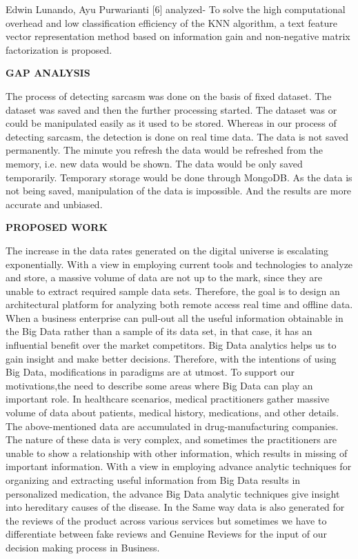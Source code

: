 \documentclass[oneside,a4paper,12pt]{book}
\begin{document}
Edwin Lunando, Ayu Purwarianti [6] analyzed- To solve the high computational overhead and low classification efficiency of the KNN algorithm, a text feature vector representation method based on information gain and non-negative matrix factorization is proposed.


\textbf{GAP ANALYSIS}
\par
The process of detecting sarcasm was done on the basis of fixed dataset. The dataset was saved and then the further processing started. The dataset was or could be manipulated easily as it used to be stored. Whereas in our process of detecting sarcasm, the detection  is done on real time data. The data is not saved permanently. The minute you refresh the data would be refreshed from the memory, i.e. new data would be shown. The data would be only saved temporarily. Temporary storage would be done through MongoDB. As the data is not being saved, manipulation of the data is impossible. And the results are more accurate and unbiased. 

\textbf{PROPOSED WORK}
\par
The increase in the data rates generated on the digital universe is escalating exponentially. With a view in employing current tools and technologies to analyze and store, a massive volume of data are not up to the mark, since they are unable to extract required sample data sets. Therefore, the goal is to design an architectural platform for analyzing both remote access real time and offline data. When a business enterprise can pull-out all the useful information obtainable in the Big Data rather than a sample of its data set, in that case, it has an influential benefit over the market competitors. Big Data analytics helps us to gain insight and make better decisions. Therefore, with the intentions of using Big Data, modifications in paradigms are at utmost. To support our motivations,the need to describe some areas where Big Data can play an important role. In healthcare scenarios, medical practitioners gather massive volume of data about patients, medical history, medications, and other details. The above-mentioned data are accumulated in drug-manufacturing companies. The nature of these data is very complex, and sometimes the practitioners are unable to show a relationship with other information, which results in missing of important information. With a view in employing advance analytic techniques for organizing and extracting useful information from Big Data results in personalized medication, the advance Big Data analytic techniques give insight into hereditary causes of the disease. In the Same way data is also generated for the reviews of the product across various services but sometimes we have to differentiate between fake reviews and Genuine Reviews for the input of our decision making process in Business.
\end{document}
